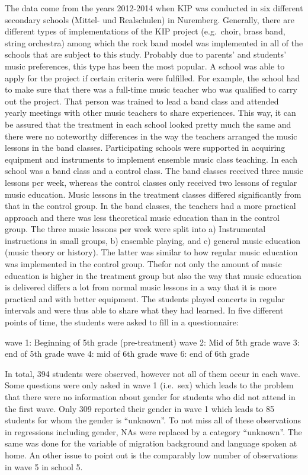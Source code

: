 \documentclass[a4, 12pt]{article}
\begin{document}
\label{sec:project}
The data come from the years 2012-2014 when KIP was conducted in six different secondary schools (Mittel- und Realschulen) in Nuremberg. Generally, there are different types of implementations of the KIP project (e.g.~choir, brass band, string orchestra) among which the rock band model was implemented in all of the schools that are subject to this study. Probably due to parents' and students' music preferences, this type has been the most popular. A school was able to apply for the project if certain criteria were fulfilled. For example, the school had to make sure that there was a full-time music teacher who was qualified to carry out the project. That person was trained to lead a band class and attended yearly meetings with other music teachers to share experiences. This way, it can be assured that the treatment in each school looked pretty much the same and there were no noteworthy differences in the way the teachers arranged the music lessons in the band classes. Participating schools were supported in acquiring equipment and instruments to implement ensemble music class teaching. In each school was a band class and a control class. The band classes received three music lessons per week, whereas the control classes only received two lessons of regular music education. Music lessons in the treatment classes differed significantly from that in the control group. In the band classes, the teachers had a more practical approach and there was less theoretical music education than in the control group. The three music lessons per week were split into a) Instrumental instructions in small groups, b) ensemble playing, and c) general music education (music theory or history). The latter was similar to how regular music education was implemented in the control group. Thefor not only the amount of music education is higher in the treatment group but also the way that music education is delivered differs a lot from normal music lessons in a way that it is more practical and with better equipment. The students played concerts in regular intervals and were thus able to share what they had learned. In five different points of time, the students were asked to fill in a questionnaire:

wave 1: Beginning of 5th grade (pre-treatment)
wave 2: Mid of 5th grade
wave 3: end of 5th grade
wave 4: mid of 6th grade
wave 6: end of 6th grade

In total, 394 students were observed, however not all of them occur in each wave. Some questions were only asked in wave 1 (i.e.~sex) which leads to the problem that there were no information about gender for students who did not attend in the first wave. Only 309 reported their gender in wave 1 which leads to 85 students for whom the gender is ``unknown''. To not miss all of these observations in regressions including gender, NAs were replaced by a category ``unknown''. The same was done for the variable of migration background and language spoken at home. An other issue to point out is the comparably low number of observations in wave 5 in school 5.
\end{document}
